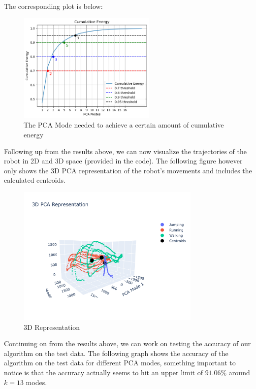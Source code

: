 \documentclass[11pt]{amsart}
\begin{document}
The corresponding plot is below:

\begin{figure}[H]
    \centering
    \includegraphics[width=0.6\textwidth]{PCA_mode_energy.png}
    \caption{The PCA Mode needed to achieve a certain amount of cumulative energy}
\end{figure}


Following up from the results above, we can now visualize the trajectories of the robot in 2D and 3D space (provided in the code). The following figure however only shows the 3D PCA representation of the robot's movements and includes the calculated centroids.


\begin{figure}[H]
    \centering
    \includegraphics[width=0.8\textwidth]{3D PCA Centroid.png}
    \caption{3D Representation}
\end{figure}

Continuing on from the results above, we can work on testing the accuracy of our algorithm on the test data. The following graph shows the accuracy of the algorithm on the test data for different PCA modes, something important to notice is that the accuracy actually seems to hit an upper limit of $91.06\%$ around $k = 13$ modes.
\end{document}
